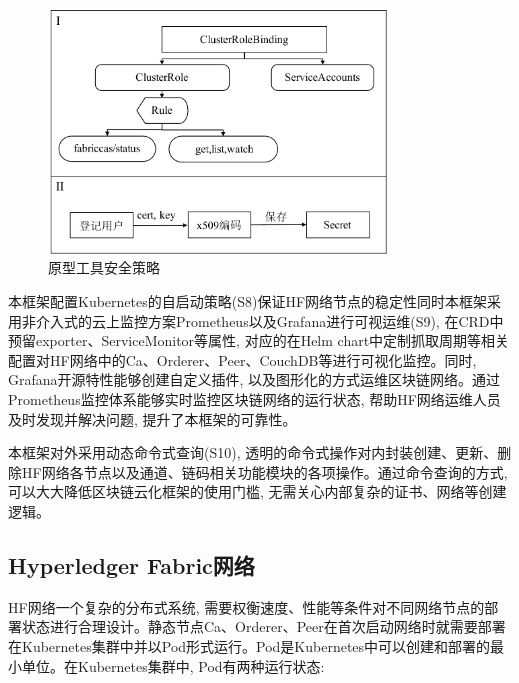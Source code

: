 \begin{figure}[h] %
    \centering %
    \includegraphics[width=0.8\textwidth]{FIGs/chapter4/safety.pdf} %
    \caption{原型工具安全策略} %
    \label{safety} %
\end{figure}%

本框架配置Kubernetes的自启动策略(S8)保证HF网络节点的稳定性同时本框架采用非介入式的云上监控方案Prometheus以及Grafana进行可视运维(S9), 在CRD中预留exporter、ServiceMonitor等属性, 对应的在Helm chart中定制抓取周期等相关配置对HF网络中的Ca、Orderer、Peer、CouchDB等进行可视化监控。同时, Grafana开源特性能够创建自定义插件, 以及图形化的方式运维区块链网络。通过Prometheus监控体系能够实时监控区块链网络的运行状态, 帮助HF网络运维人员及时发现并解决问题, 提升了本框架的可靠性。

本框架对外采用动态命令式查询(S10), 透明的命令式操作对内封装创建、更新、删除HF网络各节点以及通道、链码相关功能模块的各项操作。通过命令查询的方式, 可以大大降低区块链云化框架的使用门槛, 无需关心内部复杂的证书、网络等创建逻辑。

\subsection{Hyperledger Fabric网络}

HF网络一个复杂的分布式系统, 需要权衡速度、性能等条件对不同网络节点的部署状态进行合理设计。静态节点Ca、Orderer、Peer在首次启动网络时就需要部署在Kubernetes集群中并以Pod形式运行。Pod是Kubernetes中可以创建和部署的最小单位。在Kubernetes集群中, Pod有两种运行状态:

